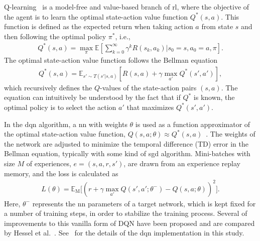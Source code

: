 Q-learning~\cite{Watkins1992} is a model-free and value-based branch of \gls{rl}, where the objective of the agent is to learn the optimal state-action value function $Q^*(s,a)$. This function is defined as the expected return when taking action $a$ from state $s$ and then following the optimal policy $\pi^*$, i.e.,
%
\begin{align}
     Q^*(s,a) = \max_\pi \mathbb{E} \left[ \sum_{k=0}^\infty \gamma^k R(s_k, a_k) | s_0 = s, a_0 = a, \pi\right].
\end{align}
The optimal state-action value function follows the Bellman equation
\begin{align}
    Q^*(s,a) = \mathbb{E}_{s' \sim T(s'|s,a)}\left[R(s,a) + \gamma \max_{a'} Q^*(s',a')\right],
\end{align}
%
which recursively defines the $Q$-values of the state-action pairs $(s,a)$. The equation can intuitively be understood by the fact that if $Q^*$ is known, the optimal policy is to select the action $a'$ that maximizes $Q^*(s',a')$.

In the \gls{dqn} algorithm, a \gls{nn} with weights $\theta$ is used as a function approximator of the optimal state-action value function, $Q(s,a;\theta) \approx Q^*(s,a)$~\cite{Mnih2015}. The weights of the network are adjusted to minimize the temporal difference (TD) error in the Bellman equation, typically with some kind of \gls{sgd} algorithm. Mini-batches with size $M$ of experiences, $e=(s,a,r,s')$, are drawn from an experience replay memory, and the loss is calculated as
%
\begin{align}
    L(\theta) = \mathbb{E}_\mathrm{M} \Big[ (r + \gamma \max_{a'} Q(s',a';\theta^-)
    - Q(s,a;\theta) )^2 \Big].
    \label{eq:lossDQN}
\end{align}
%
Here, $\theta^-$ represents the \gls{nn} parameters of a target network, which is kept fixed for a number of training steps, in order to stabilize the training process. 
Several of improvements to this vanilla form of DQN have been proposed and are compared by Hessel et al.~\cite{Hessel2018}.
See \paperLSTM \ for the details of the \gls{dqn} implementation in this study.